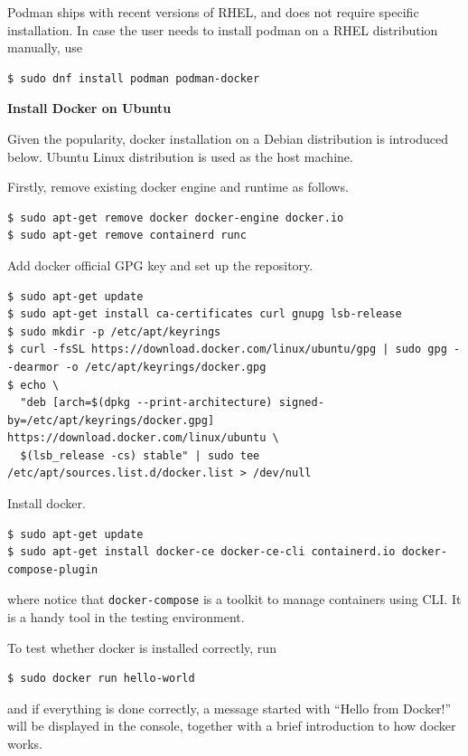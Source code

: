 Podman ships with recent versions of RHEL, and does not require specific installation. In case the user needs to install podman on a RHEL distribution manually, use
\begin{lstlisting}
$ sudo dnf install podman podman-docker
\end{lstlisting}

\vspace{0.1in}
\noindent \textbf{Install Docker on Ubuntu}
\vspace{0.1in}

Given the popularity, docker installation on a Debian distribution is introduced below. Ubuntu Linux distribution is used as the host machine. 

Firstly, remove existing docker engine and runtime as follows.
\begin{lstlisting}
$ sudo apt-get remove docker docker-engine docker.io
$ sudo apt-get remove containerd runc
\end{lstlisting}

Add docker official GPG key and set up the repository.
\begin{lstlisting}
$ sudo apt-get update
$ sudo apt-get install ca-certificates curl gnupg lsb-release
$ sudo mkdir -p /etc/apt/keyrings
$ curl -fsSL https://download.docker.com/linux/ubuntu/gpg | sudo gpg --dearmor -o /etc/apt/keyrings/docker.gpg
$ echo \
  "deb [arch=$(dpkg --print-architecture) signed-by=/etc/apt/keyrings/docker.gpg] https://download.docker.com/linux/ubuntu \
  $(lsb_release -cs) stable" | sudo tee /etc/apt/sources.list.d/docker.list > /dev/null
\end{lstlisting}

Install docker.
\begin{lstlisting}
$ sudo apt-get update
$ sudo apt-get install docker-ce docker-ce-cli containerd.io docker-compose-plugin
\end{lstlisting}
where notice that \verb|docker-compose| is a toolkit to manage containers using CLI. It is a handy tool in the testing environment.

To test whether docker is installed correctly, run
\begin{lstlisting}
$ sudo docker run hello-world
\end{lstlisting}
and if everything is done correctly, a message started with ``Hello from Docker!'' will be displayed in the console, together with a brief introduction to how docker works.

